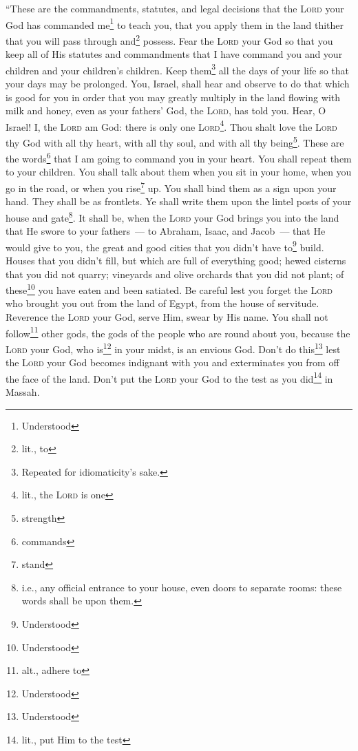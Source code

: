 
\begin{inparaenum}
     ``These are the commandments, statutes, and legal decisions that the \textsc{Lord} your God has commanded me\footnote{Understood} to teach you, that you apply them in the land thither that you will pass through and\footnote{lit., to} possess.%
     Fear the \textsc{Lord} your God so that you keep all of His statutes and commandments that I have command you and your children and your children's children. Keep them\footnote{Repeated for idiomaticity's sake.} all the days of your life so that your days may be prolonged.%
     You, Israel, shall hear and observe to do that which is good for you in order that you may greatly multiply in the land flowing with milk and honey, even as your fathers' God, the \textsc{Lord}, has told you.%
     Hear, O Israel! I, the \textsc{Lord} am God: there is only one \textsc{Lord}\footnote{lit., the \textsc{Lord} is one}.%
     Thou shalt love the \textsc{Lord} thy God with all thy heart, with all thy soul, and with all thy being\footnote{strength}.%
     These are the words\footnote{commands} that I am going to command you in your heart.%
     You shall repeat them to your children. You shall talk about them when you sit in your home, when you go in the road, or when you rise\footnote{stand} up.%
     You shall bind them as a sign upon your hand. They shall be as frontlets.%
     Ye shall write them upon the lintel posts of your house and gate\footnote{i.e., any official entrance to your house, even doors to separate rooms: these words shall be upon them.}.%
     It shall be, when the \textsc{Lord} your God brings you into the land that He swore to your fathers~--- to Abraham, Isaac, and Jacob~--- that He would give to you, the great and good cities that you didn't have to\footnote{Understood} build.%
     Houses that you didn't fill, but which are full of everything good; hewed cisterns that you did not quarry; vineyards and olive orchards that you did not plant; of these\footnote{Understood} you have eaten and been satiated.%
     Be careful lest you forget the \textsc{Lord} who brought you out from the land of Egypt, from the house of servitude.%
     Reverence the \textsc{Lord} your God, serve Him, swear by His name.%
     You shall not follow\footnote{alt., adhere to} other gods, the gods of the people who are round about you,%
     because the \textsc{Lord} your God, who is\footnote{Understood} in your midst, is an envious God. Don't do this\footnote{Understood} lest the \textsc{Lord} your God becomes indignant with you and exterminates you from off the face of the land.%
     Don't put the \textsc{Lord} your God to the test as you did\footnote{lit., put Him to the test} in Massah.%
\end{inparaenum}
